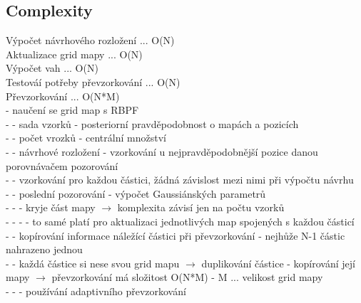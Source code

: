 \documentclass[11pt]{article}
\begin{document}
\subsection{Complexity}
Výpočet návrhového rozložení ... O(N)\\
Aktualizace grid mapy ... O(N)\\
Výpočet vah ... O(N)\\
Testováí potřeby převzorkování ... O(N)\\
Převzorkování ... O(N*M)\\
 - naučení se grid map s RBPF\\
 - - sada vzorků - posteriorní pravděpodobnost o mapách a pozicích\\
 - - počet vrozků - centrální množství\\
 - - návrhové rozložení - vzorkování u nejpravděpodobnější pozice danou porovnávačem pozorování\\
 - - vzorkování pro každou částici, žádná závislost mezi nimi při výpočtu návrhu\\
 - - poslední pozorování - výpočet Gaussiánských parametrů\\
 - - - kryje část mapy $\rightarrow$ komplexita závisí jen na počtu vzorků\\
 - - - - to samé platí pro aktualizaci jednotlivých map spojených s každou částicí\\
 - - kopírování informace náležící částici při převzorkování - nejhůže N-1 částic nahrazeno jednou\\
 - - každá částice si nese svou grid mapu $\rightarrow$ duplikování částice - kopírování její mapy $\rightarrow$ převzorkování má složitost O(N*M) - M ... velikost grid mapy\\
 - - - používání adaptivního převzorkování\\
\end{document}
